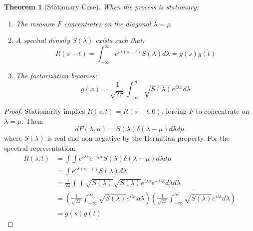 \documentclass{article}
\newtheorem{theorem}{Theorem}
\begin{document}
\begin{theorem}[Stationary Case]
When the process is stationary:
\begin{enumerate}
    \item The measure $F$ concentrates on the diagonal $\lambda = \mu$
    \item A spectral density $S(\lambda)$ exists such that:
    \[R(s-t) = \int_{-\infty}^{\infty} e^{i\lambda(s-t)} S(\lambda)d\lambda = g(s)\overline{g(t)}\]
    \item The factorization becomes:
    \[g(x) = \frac{1}{\sqrt{2\pi}}\int_{-\infty}^{\infty} \sqrt{S(\lambda)}e^{i\lambda x}d\lambda\]
\end{enumerate}
\end{theorem}

\begin{proof}
Stationarity implies $R(s,t) = R(s-t,0)$, forcing $F$ to concentrate on $\lambda = \mu$. Then:
\[dF(\lambda,\mu) = S(\lambda)\delta(\lambda-\mu)d\lambda d\mu\]
where $S(\lambda)$ is real and non-negative by the Hermitian property. For the spectral representation:
\begin{align*}
R(s,t) &= \int\int e^{i\lambda s}e^{-i\mu t}S(\lambda)\delta(\lambda-\mu)d\lambda d\mu \\
&= \int e^{i\lambda(s-t)}S(\lambda)d\lambda \\
&= \frac{1}{2\pi}\int\int \sqrt{S(\lambda)}\sqrt{S(\lambda)}e^{i\lambda s}e^{-i\lambda t}d\lambda d\lambda \\
&= \left(\frac{1}{\sqrt{2\pi}}\int_{-\infty}^{\infty} \sqrt{S(\lambda)}e^{i\lambda s}d\lambda\right)\overline{\left(\frac{1}{\sqrt{2\pi}}\int_{-\infty}^{\infty} \sqrt{S(\lambda)}e^{i\lambda t}d\lambda\right)} \\
&= g(s)\overline{g(t)}
\end{align*}
\end{proof}
\end{document}
